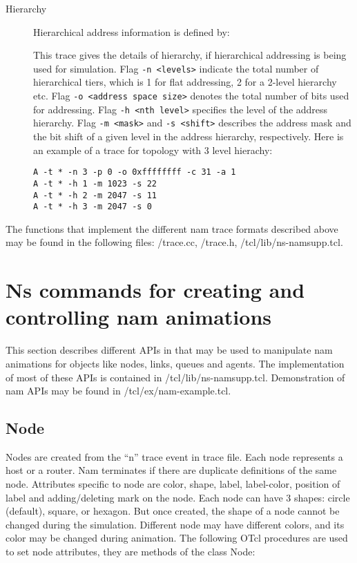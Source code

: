 \begin{description}
\item[Hierarchy] Hierarchical address information is defined by:

  
  This trace gives the details of hierarchy, if hierarchical
  addressing is being used for simulation. 
  Flag {\tt -n <levels>}
  indicate the total number of hierarchical tiers, which is 1 for flat
  addressing, 2 for a 2-level hierarchy etc. 
  Flag {\tt -o <address space size>} 
  denotes the total number of bits used for addressing. 
  Flag {\tt -h <nth level>} specifies the level of the address
  hierarchy. 
  Flag {\tt -m <mask>} and {\tt -s <shift>} describes the address mask
  and the bit shift of a given level in the address hierarchy,
  respectively. 
  Here is an example of a trace for topology with 3 level hierachy:
\begin{verbatim}
A -t * -n 3 -p 0 -o 0xffffffff -c 31 -a 1
A -t * -h 1 -m 1023 -s 22
A -t * -h 2 -m 2047 -s 11
A -t * -h 3 -m 2047 -s 0 
\end{verbatim}
\end{description}

The functions that implement the different nam trace formats described
above may be found in the following files: \ns/trace.cc, 
\ns/trace.h, \ns/tcl/lib/ns-namsupp.tcl.

\section{Ns commands for creating and controlling nam animations}
\label{sec:namcommands}

This section describes different APIs in \ns that may be used to
manipulate nam animations for objects like nodes, links, queues and
agents. 
The implementation of most of these APIs is contained in
\ns/tcl/lib/ns-namsupp.tcl.
Demonstration of nam APIs may be found in \ns/tcl/ex/nam-example.tcl.

\subsection{Node}

Nodes are created from the ``n'' trace event in trace file. 
Each node represents a host or a router. 
Nam terminates if there are duplicate definitions of the same node.
Attributes specific to node are color, shape, label, label-color,
position of label and adding/deleting mark on the node.
Each node can have 3 shapes: circle (default), square, or hexagon.
But once created, the shape of a node cannot be changed during the
simulation.
Different node may have different colors, and its color may be changed
during animation. 
The following OTcl procedures are used to set node attributes, they
are methods of the class Node:

